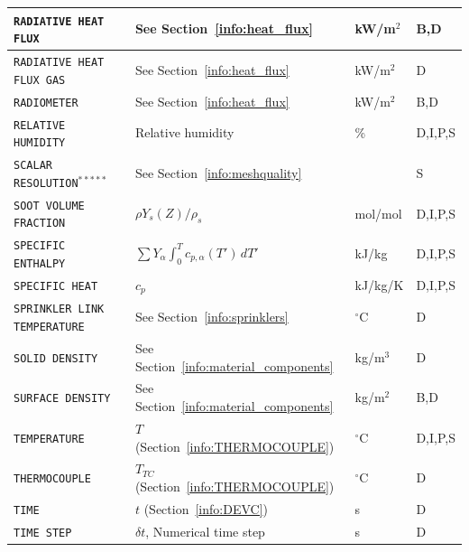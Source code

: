 \documentclass[11pt]{book}
\newcommand{\ct}{\tt\small}
\begin{document}
\begin{longtable}{@{\extracolsep{\fill}}|l|l|l|l|}
{\ct RADIATIVE HEAT FLUX}                       & See Section~\ref{info:heat_flux}              & kW/m$^2$       & B,D          \\ \hline
{\ct RADIATIVE HEAT FLUX GAS}                   & See Section~\ref{info:heat_flux}              & kW/m$^2$       & D            \\ \hline
{\ct RADIOMETER}                                & See Section~\ref{info:heat_flux}              & kW/m$^2$       & B,D          \\ \hline
{\ct RELATIVE HUMIDITY}                         & Relative humidity                             & \%             & D,I,P,S      \\ \hline
{\ct SCALAR RESOLUTION}$^{*****}$               &  See Section~\ref{info:meshquality}           &                & S            \\ \hline
{\ct SOOT VOLUME FRACTION}                      & $\rho Y_s(Z)/\rho_s$                          & mol/mol        & D,I,P,S      \\ \hline
{\ct SPECIFIC ENTHALPY}                         & $\sum Y_\alpha \int_0^T c_{p,\alpha}(T') \, dT'$  & kJ/kg    & D,I,P,S        \\ \hline
{\ct SPECIFIC HEAT}                             & $c_p$                                         & kJ/kg/K        & D,I,P,S      \\ \hline
{\ct SPRINKLER LINK TEMPERATURE}                & See Section~\ref{info:sprinklers}             & $^\circ$C      & D            \\ \hline
{\ct SOLID DENSITY}                             & See Section~\ref{info:material_components}    & kg/m$^3$       & D            \\ \hline
{\ct SURFACE DENSITY}                           & See Section~\ref{info:material_components}    & kg/m$^2$       & B,D          \\ \hline
{\ct TEMPERATURE}                               & $T$ (Section~\ref{info:THERMOCOUPLE})         & $^\circ$C      & D,I,P,S      \\ \hline
{\ct THERMOCOUPLE}                              & $T_{TC}$ (Section~\ref{info:THERMOCOUPLE})    & $^\circ$C      & D            \\ \hline
{\ct TIME}                                      & $t$ (Section~\ref{info:DEVC})                 & s              & D            \\ \hline
{\ct TIME STEP}                                 & $\delta t$, Numerical time step               & s              & D            \\ \hline

\end{longtable}
\end{document}
